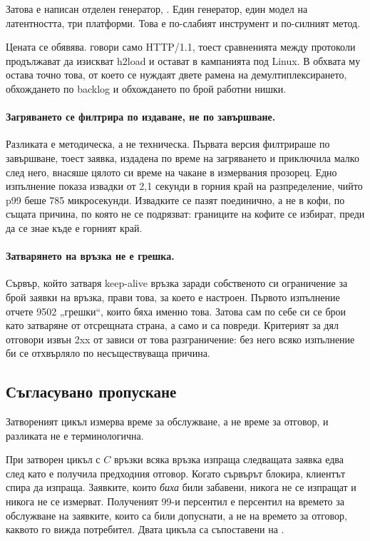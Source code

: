 Затова е написан отделен генератор, . Един генератор, един модел на латентността,
три платформи. Това е по-слабият инструмент и по-силният метод.

Цената се обявява.  говори само HTTP/1.1, тоест сравненията между протоколи
продължават да изискват h2load \cite{nghttp2} и остават в кампанията под Linux. В обхвата му
остава точно това, от което се нуждаят двете рамена на демултиплексирането, обхождането по
backlog и обхождането по брой работни нишки.

\paragraph{Загряването се филтрира по издаване, не по завършване.} Разликата е методическа, а
не техническа. Първата версия филтрираше по завършване, тоест заявка, издадена по време на
загряването и приключила малко след него, внасяше цялото си време на чакане в измервания
прозорец. Едно изпълнение показа извадки от 2,1 секунди в горния край на разпределение, чийто
p99 беше 785 микросекунди. Извадките се пазят поединично, а не в кофи, по същата причина, по
която не се подрязват: границите на кофите се избират, преди да се знае къде е горният край.

\paragraph{Затварянето на връзка не е грешка.} Сървър, който затваря keep-alive връзка заради
собственото си ограничение за брой заявки на връзка, прави това, за което е настроен. Първото
изпълнение отчете 9502 „грешки“, които бяха именно това. Затова  сам по себе си
се брои като затваряне от отсрещната страна, а само  и  са
повреди. Критерият за дял отговори извън 2xx от  зависи от това
разграничение: без него всяко изпълнение би се отхвърляло по несъществуваща причина.

\subsection{Съгласувано пропускане}

Затвореният цикъл измерва време за обслужване, а не време за отговор, и разликата не е
терминологична.

При затворен цикъл с $C$ връзки всяка връзка изпраща следващата заявка едва след като е
получила предходния отговор. Когато сървърът блокира, клиентът спира да изпраща. Заявките,
които \emph{биха} били забавени, никога не се изпращат и никога не се измерват. Полученият
99-и персентил е персентил на времето за обслужване на заявките, които са били допуснати, а
не на времето за отговор, каквото го вижда потребител. Двата цикъла са съпоставени на .

